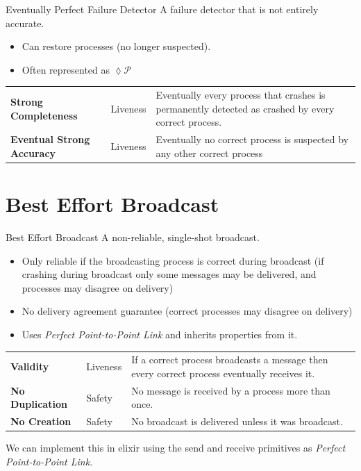 \begin{definitionbox}{Eventually Perfect Failure Detector}
  A failure detector that is not entirely accurate.
  \begin{itemize}
    \item Can restore processes (no longer suspected).
    \item Often represented as $ \lozenge  \mathcal{P}$
  \end{itemize}
  \begin{center}
    \begin{tabular}{l l p{}}
      \textbf{Strong Completeness} & Liveness & Eventually every process that crashes is permanently detected as crashed by every correct process.  \\
      \textbf{Eventual Strong Accuracy} & Liveness & Eventually no correct process is suspected by any other correct process \\
    \end{tabular}
\end{center}
\end{definitionbox}

\section{Best Effort Broadcast}
\begin{definitionbox}{Best Effort Broadcast}
    A non-reliable, single-shot broadcast.
    \begin{itemize}
        \item Only reliable if the broadcasting process is correct during broadcast (if crashing during broadcast only some messages may be delivered, and processes may disagree on delivery)
        \item No delivery agreement guarantee (correct processes may disagree on delivery)
        \item Uses \textit{Perfect Point-to-Point Link} and inherits properties from it.
    \end{itemize} 
    \begin{center}
        \begin{tabular}{l l p{}}
            \textbf{Validity} & Liveness & If a correct process broadcasts a message then every correct process eventually receives it. \\
            \textbf{No Duplication} & Safety & No message is received by a process more than once. \\
            \textbf{No Creation} & Safety & No broadcast is delivered unless it was broadcast. \\
        \end{tabular}
    \end{center}
\end{definitionbox}
We can implement this in elixir using the send and receive primitives as \textit{Perfect Point-to-Point Link}.

